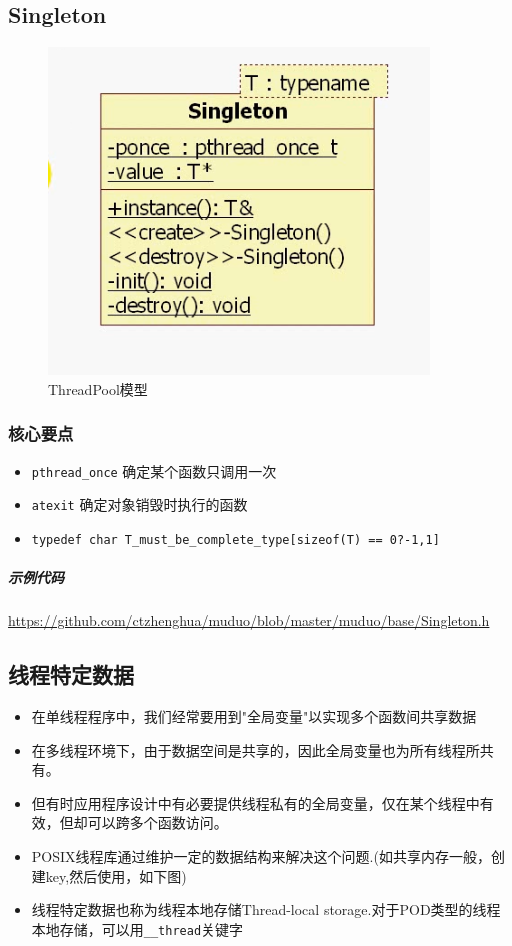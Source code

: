 \documentclass[UTF8,a4paper,8pt]{ctexbook}
\begin{document}
		\subsection{Singleton}	
				\begin{figure}[htbp]
					\centering
					\includegraphics[scale= 0.4]{figure/muduoSingleton.png}
					\caption{ThreadPool模型}
				\end{figure}
			\subsubsection{核心要点}
				\begin{itemize}
					\item \verb|pthread_once|  确定某个函数只调用一次
					\item \verb|atexit|  确定对象销毁时执行的函数
					\item \verb|typedef char T_must_be_complete_type[sizeof(T) == 0?-1,1]|
				\end{itemize}
			\subparagraph{示例代码}\url{https://github.com/ctzhenghua/muduo/blob/master/muduo/base/Singleton.h}
		
		\subsection{线程特定数据}
			\begin{itemize}
				\item 在单线程程序中，我们经常要用到"全局变量"以实现多个函数间共享数据
				\item 在多线程环境下，由于数据空间是共享的，因此全局变量也为所有线程所共有。 
				\item 但有时应用程序设计中有必要提供线程私有的全局变量，仅在某个线程中有效，但却可以跨多个函数访问。
				\item POSIX线程库通过维护一定的数据结构来解决这个问题.(如共享内存一般，创建key,然后使用，如下图)
				\item 线程特定数据也称为线程本地存储Thread-local storage.对于POD类型的线程本地存储，可以用\verb|__thread|关键字
			\end{itemize}	
			
\end{document}
